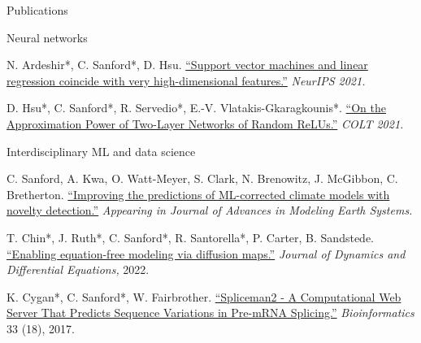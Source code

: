 \documentclass{resume} %
\begin{document}
\begin{rSection}{Publications}
\begin{rSubsection}{Neural networks}{}{}{}{}
\item N. Ardeshir*, C. Sanford*, D. Hsu. \href{https://proceedings.neurips.cc/paper/2021/hash/26d4b4313a7e5828856bc0791fca39a2-Abstract.html}{``Support vector machines and linear regression coincide with very high-dimensional features.''} \textit{NeurIPS 2021.}

\item D. Hsu*, C. Sanford*, R. Servedio*, E.-V. Vlatakis-Gkaragkounis*. \href{https://proceedings.mlr.press/v134/hsu21a.html}{``On the Approximation Power of Two-Layer Networks of Random ReLUs.''} \textit{COLT 2021.}
\end{rSubsection}

\begin{rSubsection}{Interdisciplinary ML and data science}{}{}{}{}
\item C. Sanford, A. Kwa, O. Watt-Meyer, S. Clark, N. Brenowitz, J. McGibbon, C. Bretherton. \href{https://essopenarchive.org/doi/full/10.22541/essoar.168500343.32924398}{``Improving the predictions of ML-corrected climate models with novelty detection.''} \textit{Appearing in Journal of Advances in Modeling Earth Systems.}

\item T. Chin*, J. Ruth*, C. Sanford*, R. Santorella*, P. Carter, B. Sandstede. \href{https://link.springer.com/article/10.1007/s10884-021-10127-w}{``Enabling equation-free modeling via diffusion maps.''} \textit{Journal of Dynamics and Differential Equations,} 2022.

\item K. Cygan*, C. Sanford*, W. Fairbrother. \href{https://academic.oup.com/bioinformatics/article/33/18/2943/3887237?login=true}{``Spliceman2 - A Computational Web Server That Predicts Sequence Variations in Pre-mRNA Splicing.''}
\textit{Bioinformatics} 33 (18), 2017.
\end{rSubsection}


\end{rSection}


\end{document}
